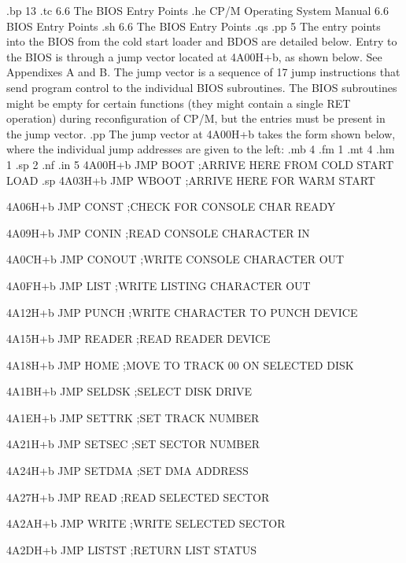 .bp 13
.tc    6.6  The BIOS Entry Points
.he CP/M Operating System Manual               6.6  BIOS Entry Points
.sh
6.6  The BIOS Entry Points
.qs
.pp 5
The entry points into the BIOS from the cold start loader and 
BDOS are detailed below.  Entry to the BIOS is through a jump 
vector located at 4A00H+b, as shown below.  See Appendixes A and 
B.  The jump vector is a sequence of 17 jump 
instructions that send program control to the individual BIOS 
subroutines.  The BIOS subroutines might be empty for certain 
functions (they might contain a single RET operation) 
during reconfiguration of CP/M, but the entries must be present 
in the jump vector.
.pp
The jump vector at 4A00H+b takes the form shown below, where the 
individual jump addresses are given to the left:
.mb 4
.fm 1
.mt 4
.hm 1
.sp 2
.nf
.in 5
4A00H+b      JMP BOOT       ;ARRIVE HERE FROM COLD
                             START LOAD
.sp
4A03H+b      JMP WBOOT      ;ARRIVE HERE FOR WARM START

4A06H+b      JMP CONST      ;CHECK FOR CONSOLE CHAR
                             READY

4A09H+b      JMP CONIN      ;READ CONSOLE CHARACTER IN

4A0CH+b      JMP CONOUT     ;WRITE CONSOLE CHARACTER
                             OUT

4A0FH+b      JMP LIST       ;WRITE LISTING CHARACTER OUT

4A12H+b      JMP PUNCH      ;WRITE CHARACTER TO PUNCH
                             DEVICE

4A15H+b      JMP READER     ;READ READER DEVICE

4A18H+b      JMP HOME       ;MOVE TO TRACK 00 ON
                             SELECTED DISK

4A1BH+b      JMP SELDSK     ;SELECT DISK DRIVE

4A1EH+b      JMP SETTRK     ;SET TRACK NUMBER

4A21H+b      JMP SETSEC     ;SET SECTOR NUMBER

4A24H+b      JMP SETDMA     ;SET DMA ADDRESS

4A27H+b      JMP READ       ;READ SELECTED SECTOR

4A2AH+b      JMP WRITE      ;WRITE SELECTED SECTOR

4A2DH+b      JMP LISTST     ;RETURN LIST STATUS

